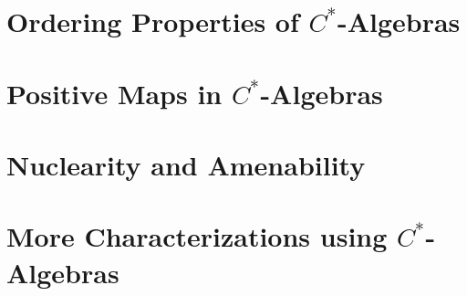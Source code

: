 \section{Ordering Properties of $C^{\ast}$-Algebras}%

\section{Positive Maps in \texorpdfstring{$C^{\ast}$-Algebras}{C*-Algebras}}%

\section{Nuclearity and Amenability}%

\section{More Characterizations using $C^{\ast}$-Algebras}%

